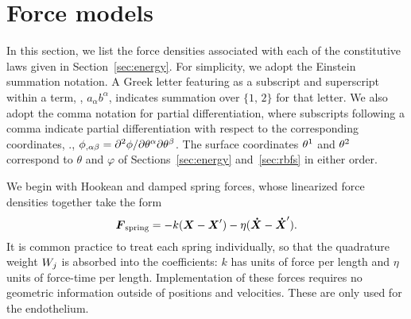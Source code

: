 \section{Force models}\label{sec:forces}
In this section, we list the force densities associated with each of the constitutive
laws given in Section~\ref{sec:energy}. For simplicity, we adopt the Einstein summation
notation. A Greek letter featuring as a subscript and superscript within a term,
, $a_\alpha b^\alpha$, indicates summation over $\{1,\,2\}$ for that letter.
We also adopt the comma notation for partial differentiation, where subscripts following
a comma indicate partial differentiation with respect to the corresponding coordinates,
., $\phi_{,\alpha\beta} = \partial^2\phi/\partial\q[\alpha]\partial\q[\beta]$.
The surface coordinates $\q[1]$ and $\q[2]$ correspond to $\theta$ and $\varphi$ of
Sections~\ref{sec:energy} and~\ref{sec:rbfs} in either order.

We begin with Hookean and damped spring forces, whose linearized force densities together
take the form
\begin{equation}
    \boldsymbol{F}_\text{spring} = -k (\boldsymbol{X} - \boldsymbol{X}') - \eta(\boldsymbol{\dot{X}} - \boldsymbol{\dot{X}}').
\end{equation}
It is common practice to treat each spring individually, so that the quadrature weight
$\weight[j]$ is absorbed into the coefficients: $k$ has units of force per length and
$\eta$ units of force-time per length. Implementation of these forces requires no
geometric information outside of positions and velocities. These are only used for the
endothelium.

